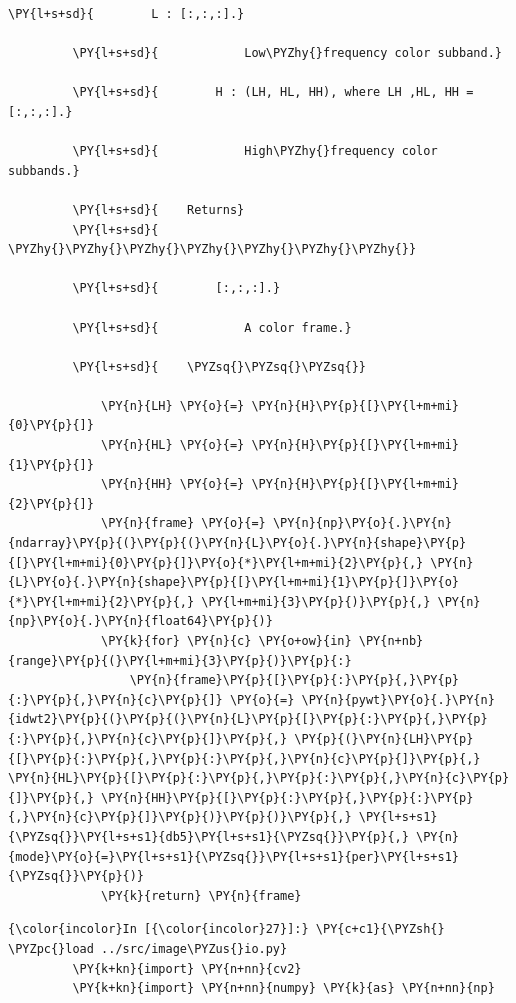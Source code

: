 {\begin{Verbatim}[commandchars=\\\{\}]
         \PY{l+s+sd}{        L : [:,:,:].}
         
         \PY{l+s+sd}{            Low\PYZhy{}frequency color subband.}
         
         \PY{l+s+sd}{        H : (LH, HL, HH), where LH ,HL, HH = [:,:,:].}
         
         \PY{l+s+sd}{            High\PYZhy{}frequency color subbands.}
         
         \PY{l+s+sd}{    Returns}
         \PY{l+s+sd}{    \PYZhy{}\PYZhy{}\PYZhy{}\PYZhy{}\PYZhy{}\PYZhy{}\PYZhy{}}
         
         \PY{l+s+sd}{        [:,:,:].}
         
         \PY{l+s+sd}{            A color frame.}
         
         \PY{l+s+sd}{    \PYZsq{}\PYZsq{}\PYZsq{}}
         
             \PY{n}{LH} \PY{o}{=} \PY{n}{H}\PY{p}{[}\PY{l+m+mi}{0}\PY{p}{]}
             \PY{n}{HL} \PY{o}{=} \PY{n}{H}\PY{p}{[}\PY{l+m+mi}{1}\PY{p}{]}
             \PY{n}{HH} \PY{o}{=} \PY{n}{H}\PY{p}{[}\PY{l+m+mi}{2}\PY{p}{]}
             \PY{n}{frame} \PY{o}{=} \PY{n}{np}\PY{o}{.}\PY{n}{ndarray}\PY{p}{(}\PY{p}{(}\PY{n}{L}\PY{o}{.}\PY{n}{shape}\PY{p}{[}\PY{l+m+mi}{0}\PY{p}{]}\PY{o}{*}\PY{l+m+mi}{2}\PY{p}{,} \PY{n}{L}\PY{o}{.}\PY{n}{shape}\PY{p}{[}\PY{l+m+mi}{1}\PY{p}{]}\PY{o}{*}\PY{l+m+mi}{2}\PY{p}{,} \PY{l+m+mi}{3}\PY{p}{)}\PY{p}{,} \PY{n}{np}\PY{o}{.}\PY{n}{float64}\PY{p}{)}
             \PY{k}{for} \PY{n}{c} \PY{o+ow}{in} \PY{n+nb}{range}\PY{p}{(}\PY{l+m+mi}{3}\PY{p}{)}\PY{p}{:}
                 \PY{n}{frame}\PY{p}{[}\PY{p}{:}\PY{p}{,}\PY{p}{:}\PY{p}{,}\PY{n}{c}\PY{p}{]} \PY{o}{=} \PY{n}{pywt}\PY{o}{.}\PY{n}{idwt2}\PY{p}{(}\PY{p}{(}\PY{n}{L}\PY{p}{[}\PY{p}{:}\PY{p}{,}\PY{p}{:}\PY{p}{,}\PY{n}{c}\PY{p}{]}\PY{p}{,} \PY{p}{(}\PY{n}{LH}\PY{p}{[}\PY{p}{:}\PY{p}{,}\PY{p}{:}\PY{p}{,}\PY{n}{c}\PY{p}{]}\PY{p}{,} \PY{n}{HL}\PY{p}{[}\PY{p}{:}\PY{p}{,}\PY{p}{:}\PY{p}{,}\PY{n}{c}\PY{p}{]}\PY{p}{,} \PY{n}{HH}\PY{p}{[}\PY{p}{:}\PY{p}{,}\PY{p}{:}\PY{p}{,}\PY{n}{c}\PY{p}{]}\PY{p}{)}\PY{p}{)}\PY{p}{,} \PY{l+s+s1}{\PYZsq{}}\PY{l+s+s1}{db5}\PY{l+s+s1}{\PYZsq{}}\PY{p}{,} \PY{n}{mode}\PY{o}{=}\PY{l+s+s1}{\PYZsq{}}\PY{l+s+s1}{per}\PY{l+s+s1}{\PYZsq{}}\PY{p}{)}
             \PY{k}{return} \PY{n}{frame}
\end{Verbatim}


    \begin{Verbatim}[commandchars=\\\{\}]
{\color{incolor}In [{\color{incolor}27}]:} \PY{c+c1}{\PYZsh{} \PYZpc{}load ../src/image\PYZus{}io.py}
         \PY{k+kn}{import} \PY{n+nn}{cv2}
         \PY{k+kn}{import} \PY{n+nn}{numpy} \PY{k}{as} \PY{n+nn}{np}
         

\end{Verbatim}}
